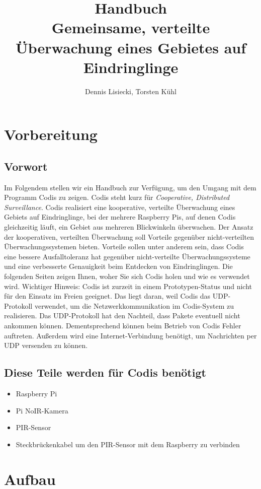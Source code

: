 \documentclass[12pt,a4paper]{scrreprt}
\title{Handbuch \\ Gemeinsame, verteilte Überwachung eines Gebietes auf Eindringlinge}
\author{Dennis Lisiecki, Torsten Kühl}
\begin{document}
\maketitle	%
\tableofcontents	%


\chapter{Vorbereitung}
\section{Vorwort}
Im Folgendem stellen wir ein Handbuch zur Verfügung, um den Umgang mit dem Programm Codis zu zeigen. Codis steht kurz für \textit{Cooperative, Distributed Surveillance}. Codis realisiert eine kooperative, verteilte Überwachung eines Gebiets auf Eindringlinge, bei der mehrere Raspberry Pis, auf denen Codis gleichzeitig läuft, ein Gebiet aus mehreren Blickwinkeln überwachen. Der Ansatz der kooperativen, verteilten Überwachung soll Vorteile gegenüber nicht-verteilten Überwachungssystemen bieten. Vorteile sollen unter anderem sein, dass Codis eine bessere Ausfalltoleranz hat gegenüber nicht-verteilte Überwachungssysteme und eine verbesserte Genauigkeit beim Entdecken von Eindringlingen. Die folgenden Seiten zeigen Ihnen, woher Sie sich Codis holen und wie es verwendet wird. Wichtiger Hinweis: Codis ist zurzeit in einem Prototypen-Status und nicht für den Einsatz im Freien geeignet. Das liegt daran, weil Codis das UDP-Protokoll verwendet, um die Netzwerkkommunikation im Codis-System zu realisieren. Das UDP-Protokoll hat den Nachteil, dass Pakete eventuell nicht ankommen können. Dementsprechend können beim Betrieb von Codis Fehler auftreten. Außerdem wird eine Internet-Verbindung benötigt, um Nachrichten per UDP versenden zu können.

\section{Diese Teile werden für Codis benötigt}
\begin{itemize}
\item Raspberry Pi
\item Pi NoIR-Kamera
\item PIR-Sensor
\item Steckbrückenkabel um den PIR-Sensor mit dem Raspberry zu verbinden
\end{itemize}

\chapter{Aufbau}
\end{document}
